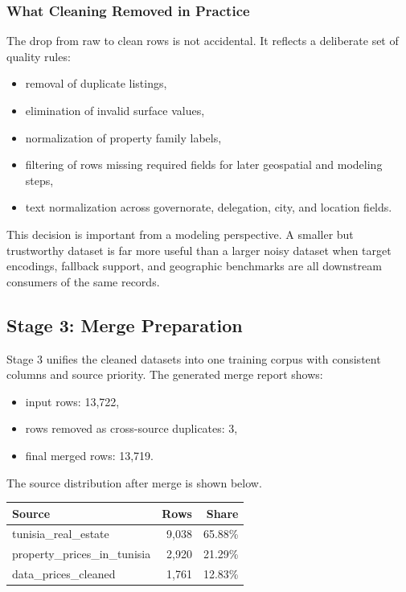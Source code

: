 \documentclass[11pt,a4paper]{article}
\begin{document}
\subsubsection{What Cleaning Removed in Practice}

The drop from raw to clean rows is not accidental. It reflects a deliberate set of quality rules:

\begin{itemize}
\item removal of duplicate listings,
\item elimination of invalid surface values,
\item normalization of property family labels,
\item filtering of rows missing required fields for later geospatial and modeling steps,
\item text normalization across governorate, delegation, city, and location fields.
\end{itemize}

This decision is important from a modeling perspective. A smaller but trustworthy dataset is far more useful than a larger noisy dataset when target encodings, fallback support, and geographic benchmarks are all downstream consumers of the same records.

\subsection{Stage 3: Merge Preparation}

Stage 3 unifies the cleaned datasets into one training corpus with consistent columns and source priority. The generated merge report shows:

\begin{itemize}
\item input rows: 13,722,
\item rows removed as cross-source duplicates: 3,
\item final merged rows: 13,719.
\end{itemize}

The source distribution after merge is shown below.

\begin{center}
\begin{tabular}{lrr}
\toprule
Source & Rows & Share \\
\midrule
tunisia\_real\_estate & 9,038 & 65.88\% \\
property\_prices\_in\_tunisia & 2,920 & 21.29\% \\
data\_prices\_cleaned & 1,761 & 12.83\% \\
\bottomrule
\end{tabular}
\end{center}
\end{document}
